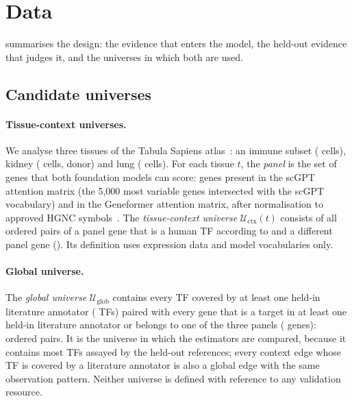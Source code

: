 \section{Data}\label{sec:data}

 summarises the design: the evidence that enters the model, the held-out evidence that judges it, and the universes in which both are used.

\subsection{Candidate universes}\label{sec:data-universes}
\paragraph{Tissue-context universes.}
We analyse three tissues of the Tabula Sapiens atlas~\citep{tabula2022}: an immune subset (\nTsCellsImm{} cells), kidney (\nTsCellsKid{} cells, \nTsDonorsKid{} donor) and lung (\nTsCellsLung{} cells).
For each tissue $t$, the \emph{panel} is the set of genes that both foundation models can score: genes present in the scGPT attention matrix (the 5{,}000 most variable genes intersected with the scGPT vocabulary) and in the Geneformer attention matrix, after normalisation to approved HGNC symbols~\citep{seal2023hgnc}.
The \emph{tissue-context universe} $\mathcal{U}_{\mathrm{ctx}}(t)$ consists of all ordered pairs of a panel gene that is a human TF according to \citet{lambert2018human} and a different panel gene ().
Its definition uses expression data and model vocabularies only.

\paragraph{Global universe.}
The \emph{global universe} $\mathcal{U}_{\mathrm{glob}}$ contains every TF covered by at least one held-in literature annotator (\nGlobTfs{} TFs) paired with every gene that is a target in at least one held-in literature annotator or belongs to one of the three panels (\nGlobGenes{} genes): \nGlobEdges{} ordered pairs.
It is the universe in which the estimators are compared, because it contains most TFs assayed by the held-out references; every context edge whose TF is covered by a literature annotator is also a global edge with the same observation pattern.
Neither universe is defined with reference to any validation resource.

